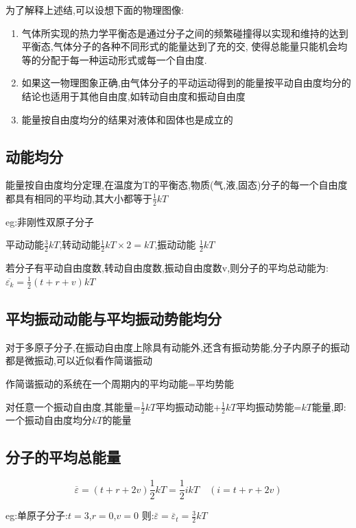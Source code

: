 \documentclass{article}
\begin{document}
为了解释上述结,可以设想下面的物理图像:

\begin{enumerate}
\item 气体所实现的热力学平衡态是通过分子之间的频繁碰撞得以实现和维持的达到平衡态,气体分子的各种不同形式的能量达到了充的交,
使得总能量只能机会均等的分配于每一种运动形式或每一个自由度.

\item 如果这一物理图象正确,由气体分子的平动运动得到的能量按平动自由度均分的结论也适用于其他自由度,如转动自由度和振动自由度

\item 能量按自由度均分的结果对液体和固体也是成立的

\end{enumerate}

\subsection{动能均分}

能量按自由度均分定理,在温度为T的平衡态,物质(气,液,固态)分子的每一个自由度都具有相同的平均动,其大小都等于$\frac{1}{2}kT$

eg:非刚性双原子分子

平动动能$\frac{3}{2}kT$,转动动能$\frac{1}{2}kT\times 2=kT$,振动动能 $\frac{1}{2}kT$

若分子有平动自由度数,转动自由度数,振动自由度数v,则分子的平均总动能为:$\overline{\varepsilon_k}=\frac{1}{2}(t+r+v)kT$

\subsection{平均振动动能与平均振动势能均分}

对于多原子分子,在振动自由度上除具有动能外,还含有振动势能,分子内原子的振动都是微振动,可以近似看作简谐振动

作简谐振动的系统在一个周期内的平均动能=平均势能

对任意一个振动自由度,其能量=$\frac{1}{2}kT$平均振动动能+$\frac{1}{2}kT$平均振动势能=$kT$能量,即:一个振动自由度均分$kT$的能量

\subsection{分子的平均总能量}

$$\overline{\varepsilon}=(t+r+2v)\frac{1}{2}kT=\frac{1}{2}ikT\quad(i=t+r+2v)$$

eg:单原子分子:$t = 3$,$r = 0$,$v = 0$ 则:$\bar{\varepsilon} = \overline{\varepsilon}_t = \frac{3}{2} kT$
\end{document}

